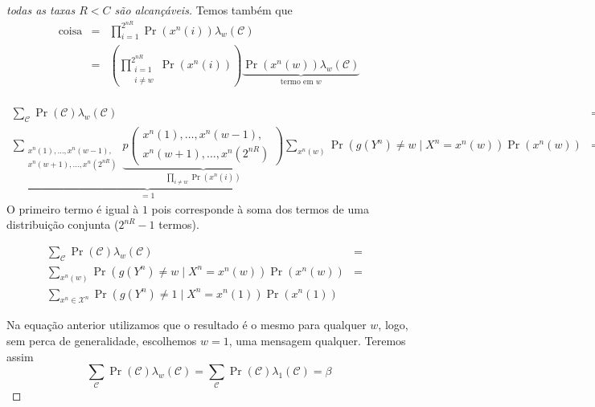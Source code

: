 \begin{frame}[allowframebreaks]
\begin{proof}[todas as taxas $R < C$ são alcançáveis]
  \proofbreak

  Temos também que
  \begin{eqnarray}
  \text{coisa} &=& \prod_{i=1}^{2^{nR}} \Pr(x^n(i)) \lambda_w(\mathcal{C}) \nonumber \\
  	&=& \left( \prod_{ \substack{ i=1 \\ i \neq w} }^{2^{nR}} \Pr(x^n(i)) \right) \underbrace{ \Pr(x^n(w)) \lambda_w(\mathcal{C}) }_{\text{termo em }w}
  \end{eqnarray}
 
  \proofbreak
 
  \vspace{-0.5cm} 
  \begin{eqnarray}
  & & \\
  \sum_{\mathcal{C}} \Pr(\mathcal{C}) \lambda_w(\mathcal{C}) &=&  \nonumber \\
  \underbrace{ \sum_{ \substack{ x^n(1), \ldots, x^n(w-1),  \\ x^n(w+1), \ldots, x^n(2^{nR}) } } \underbrace{p\left( \substack{ x^n(1), \ldots, x^n(w-1), \\ x^n(w+1), \ldots, x^n(2^{nR}) } \right)}_{\prod_{i \neq w} \Pr(x^n(i)) } }_{=1}  \sum_{x^n (w)} \Pr\left( g(Y^n) \neq w \mid X^n = x^n(w) \right)  \Pr\left( x^n(w) \right)  &=&  \nonumber
  \end{eqnarray}
  O primeiro termo é igual à $1$ pois corresponde à soma dos termos de uma distribuição conjunta ($2^{nR}-1$ termos).

  \proofbreak
  \vspace{-0.5cm}
  \begin{eqnarray}
  \sum_{\mathcal{C}} \Pr(\mathcal{C}) \lambda_w(\mathcal{C}) &=& \nonumber \\
  \sum_{x^n (w)} \Pr\left( g(Y^n) \neq w \mid X^n = x^n(w) \right) \Pr\left( x^n(w) \right) &=& \nonumber \\
  \sum_{x^n \in \mathcal{X}^n} \Pr\left( g(Y^n) \neq 1 \mid X^n = x^n(1) \right) \Pr\left( x^n(1) \right)
  \end{eqnarray}

  \proofbreak
  
  Na equação anterior utilizamos que o resultado é o mesmo para qualquer $w$, logo, sem perca
  de generalidade, escolhemos $w=1$, uma mensagem qualquer. Teremos assim
  \begin{equation}
  \sum_{\mathcal{C}} \Pr(\mathcal{C}) \lambda_w(\mathcal{C}) = \sum_{\mathcal{C}} \Pr(\mathcal{C}) \lambda_1(\mathcal{C}) = \beta
  \end{equation}


\end{proof}
\end{frame}
